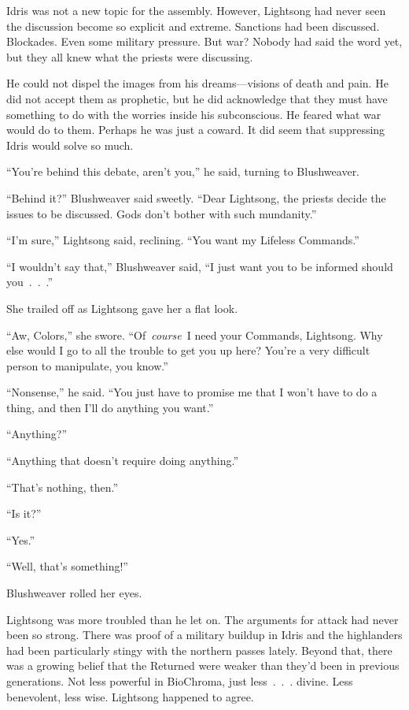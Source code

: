 Idris was not a new topic for the assembly. However, Lightsong had never seen the discussion become so explicit and extreme. Sanctions had been discussed. Blockades. Even some military pressure. But war? Nobody had said the word yet, but they all knew what the priests were discussing.

He could not dispel the images from his dreams—visions of death and pain. He did not accept them as prophetic, but he did acknowledge that they must have something to do with the worries inside his subconscious. He feared what war would do to them. Perhaps he was just a coward. It did seem that suppressing Idris would solve so much.

“You’re behind this debate, aren’t you,” he said, turning to Blushweaver.

“Behind it?” Blushweaver said sweetly. “Dear Lightsong, the priests decide the issues to be discussed. Gods don’t bother with such mundanity.”

“I’m sure,” Lightsong said, reclining. “You want my Lifeless Commands.”

“I wouldn’t say that,” Blushweaver said, “I just want you to be informed should you~.~.~.”

She trailed off as Lightsong gave her a flat look.

“Aw, Colors,” she swore. “Of~\textit{course}~I need your Commands, Lightsong. Why else would I go to all the trouble to get you up here? You’re a very difficult person to manipulate, you know.”

“Nonsense,” he said. “You just have to promise me that I won’t have to do a thing, and then I’ll do anything you want.”

“Anything?”

“Anything that doesn’t require doing anything.”

“That’s nothing, then.”

“Is it?”

“Yes.”

“Well, that’s something!”

Blushweaver rolled her eyes.

Lightsong was more troubled than he let on. The arguments for attack had never been so strong. There was proof of a military buildup in Idris and the highlanders had been particularly stingy with the northern passes lately. Beyond that, there was a growing belief that the Returned were weaker than they’d been in previous generations. Not less powerful in BioChroma, just less~.~.~. divine. Less benevolent, less wise. Lightsong happened to agree.

